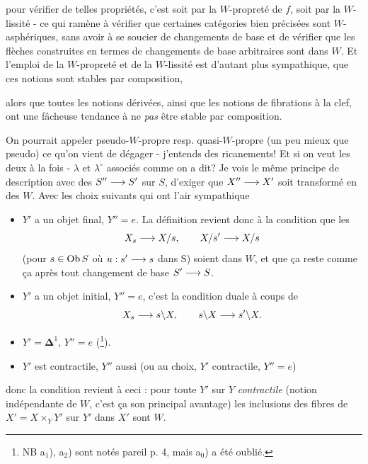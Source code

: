 \leavevmode{}pour vérifier de telles propriétés, c'est soit par la $W$-propreté de $f$, soit par la $W$-lissité - ce qui ramène à vérifier que certaines catégories bien précisées sont $W$-asphériques, sans avoir à se soucier de changements de base et de vérifier que les flèches construites en termes de changements de base arbitraires sont dans $W$. Et l'emploi de la $W$-propreté et de la $W$-lissité est d'autant plus sympathique, que ces notions sont stables par composition,

alors que toutes les notions dérivées, ainsi que les notions de fibrations à la clef, ont une fâcheuse tendance à ne \textit{pas} être stable par composition.

On pourrait appeler pseudo-$W$-propre resp. quasi-$W$-propre (un peu mieux que pseudo) ce qu'on vient de dégager - j'entends des ricanements! Et si on veut les deux à la fois - $\lambda$ et $\lambda^{\circ}$ associés comme on a dit? Je vois le même principe de description avec des $S''\longrightarrow S'$ sur $S$, d'exiger que $X''\longrightarrow X'$ soit transformé en des $W$. Avec les choix suivants qui ont l'air sympathique

\begin{itemize}
\item[a$_1$)] $Y'$ a un objet final, $Y''=e$. La définition revient donc à la condition que les
\[ X_s\longrightarrow X/s, \qquad X/s'\longrightarrow X/s \]
(pour $s\in\operatorname{Ob} S$ où $u : s'\longrightarrow s$ dans $\mathrm{S}$) soient dans $W$, et que ça reste comme ça après tout changement de base $S'\longrightarrow S$.

\item[a$_2$)] $Y'$ a un objet initial, $Y''=e$, c'est la condition duale à coups de
\[ X_s\longrightarrow s\backslash X, \qquad s\backslash X\longrightarrow s'\backslash X. \]

\item[a$_0$)] $Y'=\boldsymbol{\Delta}^1$, $Y''=e$ (\footnote[46]{NB a$_1$), a$_2$) sont notés pareil p. 4, mais a$_0$) a été oublié.}).

\item[b)] $Y'$ est contractile, $Y''$ aussi (ou au choix, $Y'$ contractile, $Y''=e$)
\end{itemize}

donc la condition revient à ceci : pour toute $Y'$ sur $Y$ \textit{contractile} (notion indépendante de $W$, c'est ça son principal avantage) les inclusions des fibres de $X'=X\times_Y Y'$ sur $Y'$ dans $X'$ sont $W$.

